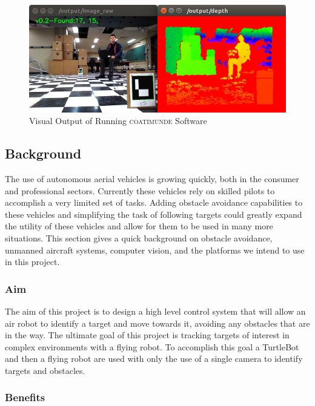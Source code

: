 \documentclass{article}[12]
\begin{document}
	\begin{figure}[]
		\centering
		\includegraphics[width=0.95\linewidth]{results}
		\caption{Visual Output of Running \textsc{coatimunde} Software}
		\label{fig:prettyresultsimage}
	\end{figure}
	
	\subsection{Background}
	
	The use of autonomous aerial vehicles is growing quickly, both in the consumer and professional sectors. Currently these vehicles rely on skilled pilots to accomplish a very limited set of tasks. Adding obstacle avoidance capabilities to these vehicles and simplifying the task of following targets could greatly expand the utility of these vehicles and allow for them to be used in many more situations. This section gives a quick background on obstacle avoidance, unmanned aircraft systems, computer vision, and the platforms we intend to use in this project.

		\subsubsection{Aim}
	
		The aim of this project is to design a high level control system that will allow an air robot to identify a target and move towards it, avoiding any obstacles that are in the way. The ultimate goal of this project is tracking targets of interest in complex environments with a flying robot. To accomplish this goal a TurtleBot and then a flying robot are used with only the use of a single camera to identify targets and obstacles. 
		
		\subsubsection{Benefits}
		
\end{document}
